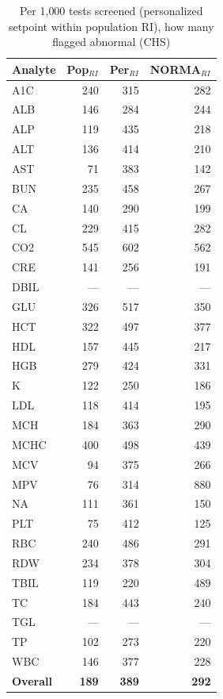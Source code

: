\begin{table}[ht]
\centering
\footnotesize
\caption{Per 1{,}000 tests screened (personalized setpoint within population RI), how many flagged abnormal (CHS)}
\begin{tabular}{lrrr}
\toprule
Analyte & Pop$_{RI}$ & Per$_{RI}$ & NORMA$_{RI}$ \\
\midrule
A1C & 240 & 315 & 282 \\
ALB & 146 & 284 & 244 \\
ALP & 119 & 435 & 218 \\
ALT & 136 & 414 & 210 \\
AST & 71 & 383 & 142 \\
BUN & 235 & 458 & 267 \\
CA & 140 & 290 & 199 \\
CL & 229 & 415 & 282 \\
CO2 & 545 & 602 & 562 \\
CRE & 141 & 256 & 191 \\
DBIL & --- & --- & --- \\
GLU & 326 & 517 & 350 \\
HCT & 322 & 497 & 377 \\
HDL & 157 & 445 & 217 \\
HGB & 279 & 424 & 331 \\
K & 122 & 250 & 186 \\
LDL & 118 & 414 & 195 \\
MCH & 184 & 363 & 290 \\
MCHC & 400 & 498 & 439 \\
MCV & 94 & 375 & 266 \\
MPV & 76 & 314 & 880 \\
NA & 111 & 361 & 150 \\
PLT & 75 & 412 & 125 \\
RBC & 240 & 486 & 291 \\
RDW & 234 & 378 & 304 \\
TBIL & 119 & 220 & 489 \\
TC & 184 & 443 & 240 \\
TGL & --- & --- & --- \\
TP & 102 & 273 & 220 \\
WBC & 146 & 377 & 228 \\
\midrule
\textbf{Overall} & \textbf{189} & \textbf{389} & \textbf{292} \\
\bottomrule
\end{tabular}
\end{table}
